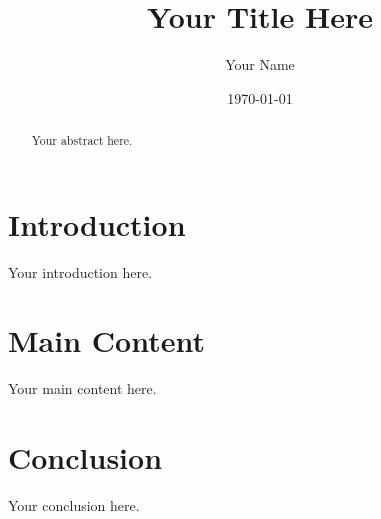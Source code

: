 \documentclass{article}
\title{Your Title Here}
\author{Your Name}
\date{\today}
\begin{document}
\maketitle

\begin{abstract}
Your abstract here.
\end{abstract}

\section{Introduction}
Your introduction here.

\section{Main Content}
Your main content here.

\section{Conclusion}
Your conclusion here.
\end{document}
